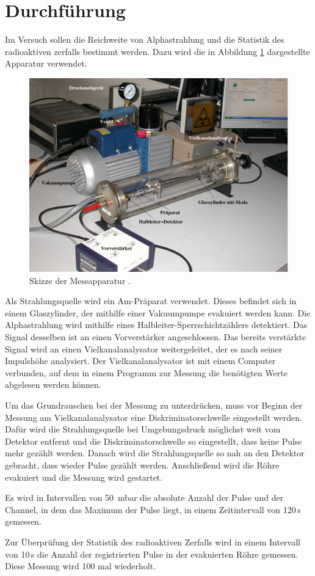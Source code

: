 \section{Durchführung}
\label{sec:Durchführung}
Im Versuch sollen die Reichweite von Alphastrahlung und die Statistik des
radioaktiven zerfalls bestimmt werden. Dazu wird die in Abbildung \ref{fig:geraet}
dargestellte Apparatur verwendet.

\begin{figure}[H]
  \centering
  \includegraphics[width=\textwidth]{data/aufbau.png}
  \caption{Skizze der Messapparatur \cite{Versuchsanleitung}.}
  \label{fig:geraet}
\end{figure}

Als Strahlungsquelle wird ein Am-Präparat verwendet. Dieses befindet sich in einem
Glaszylinder, der mithilfe einer Vakuumpumpe evakuiert werden kann. Die Alphastrahlung
wird mithilfe eines Halbleiter-Sperrschichtzählers detektiert. Das Signal desselben ist
an einen Vorverstärker angeschlossen. Das bereits verstärkte Signal wird an einen
Vielkanalanalysator weitergeleitet, der es nach seiner Impulshöhe analysiert. Der
Vielkanalanalysator ist mit einem Computer verbunden, auf dem in einem Programm zur
Messung die benötigten Werte abgelesen werden können.

Um das Grundrauschen bei der Messung zu unterdrücken, muss vor Beginn der Messung
am Vielkanalanalysator eine Diskriminatorschwelle eingestellt werden. Dafür wird
die Strahlungsquelle bei Umgebungsdruck möglichst weit vom Detektor entfernt und
die Diskriminatorschwelle so eingestellt, dass keine Pulse mehr gezählt werden.
Danach wird die Strahlungsquelle so nah an den Detektor gebracht, dass wieder
Pulse gezählt werden. Anschließend wird die Röhre evakuiert und die Messung wird gestartet.

Es wird in Intervallen von 50\, mbar die absolute Anzahl der Pulse und der Channel,
in dem das Maximum der Pulse liegt, in einem Zeitintervall von 120\,s gemessen.

Zur Überprüfung der Statistik des radioaktiven Zerfalls wird in einem Intervall
von 10\,s die Anzahl der registrierten Pulse in der evakuierten Röhre gemessen. Diese
Messung wird 100 mal wiederholt.
